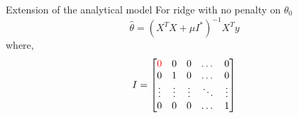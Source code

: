 \documentclass{beamer}
\begin{document}
\begin{frame}{Extension of the analytical model}
For ridge with no penalty on $\theta_0$
$$
\hat{\theta} = \left(X^TX+\mu I^*\right)^{-1}X^Ty
$$
where, $$I = \begin{bmatrix}
    \color{red}0 & 0 & 0 & \dots  & 0 \\
    0 & 1& 0 & \dots  & 0\\
    \vdots & \vdots & \vdots & \ddots & \vdots \\
    0 & 0 & 0 & \dots  & 1
\end{bmatrix}$$
\end{frame}
\end{document}
